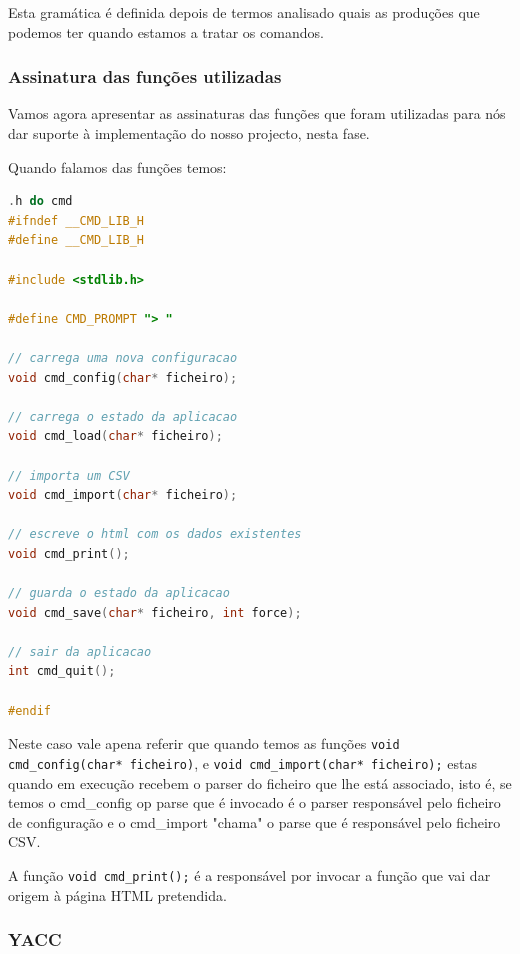 \documentclass[11pt, a4paper, oneside]{article}
\begin{document}
Esta gramática é definida depois de termos analisado quais as produções que podemos ter quando estamos a tratar os comandos.

\newpage

\subsubsection{Assinatura das funções utilizadas}
Vamos agora apresentar as assinaturas das funções que foram utilizadas para nós dar suporte à implementação do nosso projecto, nesta fase.

Quando falamos das funções temos: 
\begin{lstlisting}[language=C, caption={Construtores do ficheiro de consola.}]
.h do cmd
#ifndef __CMD_LIB_H
#define __CMD_LIB_H

#include <stdlib.h>

#define CMD_PROMPT "> "

// carrega uma nova configuracao
void cmd_config(char* ficheiro);

// carrega o estado da aplicacao
void cmd_load(char* ficheiro);

// importa um CSV
void cmd_import(char* ficheiro);

// escreve o html com os dados existentes
void cmd_print();

// guarda o estado da aplicacao
void cmd_save(char* ficheiro, int force);

// sair da aplicacao
int cmd_quit();

#endif
\end{lstlisting} 

Neste caso vale apena referir que quando temos as funções \texttt{void cmd\_config(char* ficheiro)}, e \texttt{void cmd\_import(char* ficheiro);}  estas quando em execução recebem o parser do ficheiro que lhe está associado, isto é, se temos o cmd\_config op parse que é invocado é o parser responsável pelo ficheiro de configuração e o cmd\_import "chama" o parse que é responsável pelo ficheiro CSV.

A função \texttt{void cmd\_print();} é a responsável por invocar a função que vai dar origem à página HTML pretendida.

\newpage


\subsubsection{YACC}
\end{document}
